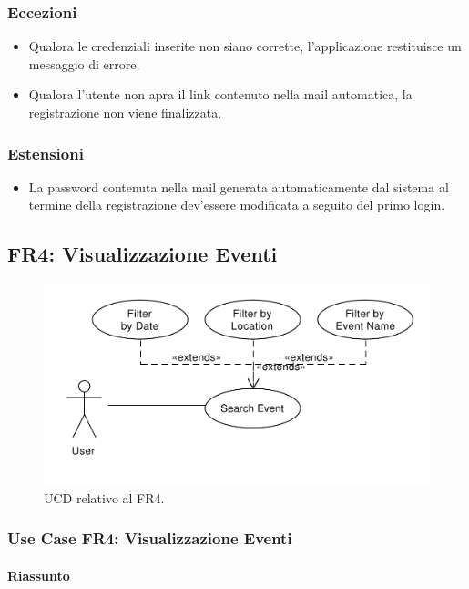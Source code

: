 \documentclass[9pt]{extarticle}
\begin{document}
\subsubsection*{Eccezioni}\label{Eccezioni-FR2}

\begin{itemize}
	\item Qualora le credenziali inserite non siano corrette, l'applicazione restituisce un messaggio di errore;
	\item Qualora l'utente non apra il link contenuto nella mail automatica, la registrazione non viene finalizzata.
\end{itemize}

\subsubsection*{Estensioni}\label{Estensioni-FR2}

\begin{itemize}
	\item La password contenuta nella mail generata automaticamente dal sistema al termine della registrazione dev'essere modificata a seguito del primo login.
\end{itemize}

\subsection{FR4: Visualizzazione Eventi}

\begin{figure}[!htb]
	\centering
	\includegraphics[width=.7\linewidth]{./images/FR4.pdf}
	\caption{UCD relativo al FR4.}
	\label{fig:UCD_FR4}
\end{figure}

\subsubsection*{Use Case FR4: Visualizzazione Eventi}

\paragraph{Riassunto}
\end{document}
